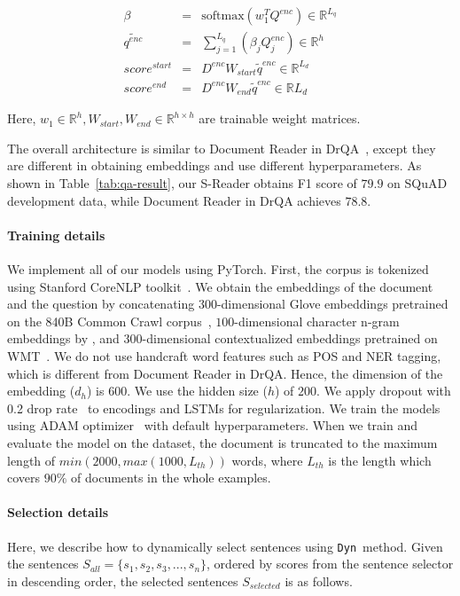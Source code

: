 \documentclass[11pt,a4paper]{article}
\newcommand{\dyn}{{\tt Dyn}}
\begin{document}
\vspace{-.5cm}
\begin{eqnarray}
	\beta &=& \mathrm{softmax} (w_1^T Q^{enc}) \in \mathbb{R}^{L_q} \\
	 {\tilde {q^{enc}}} &=& \sum_{j=1}^{L_q} (\beta_{j}Q^{enc}_j) \in \mathbb{R}^{h} \\
    score^{start} &=& D^{enc} W_{start} {\tilde q^{enc}} \in \mathbb{R}^{L_d} \\
    score^{end} &=& D^{enc} W_{end} {\tilde q^{enc}} \in \mathbb{R}{L_d}
\end{eqnarray}


Here, $w_{1} \in \mathbb{R}^{h}, W_{start}, W_{end} \in \mathbb{R}^{h \times h}$ are trainable weight matrices.

The overall architecture is similar to Document Reader in DrQA~\cite{squad-open}, except they are different in obtaining embeddings and use different hyperparameters.
As shown in Table~\ref{tab:qa-result}, our S-Reader obtains F1 score of $79.9$ on SQuAD development data, while Document Reader in DrQA achieves $78.8$.

\paragraph{Training details}
We implement all of our models using PyTorch. First, the corpus is tokenized using Stanford CoreNLP toolkit~\citep{corenlp}. We obtain the embeddings of the document and the question by concatenating $300$-dimensional Glove embeddings pretrained on the 840B Common Crawl corpus~\citep{glove}, $100$-dimensional character n-gram embeddings by \citet{charembedding}, and $300$-dimensional contextualized embeddings pretrained on WMT~\citep{cove}.
We do not use handcraft word features such as POS and NER tagging, which is different from Document Reader in DrQA.
Hence, the dimension of the embedding ($d_h$) is 600. We use the hidden size ($h$) of $200$.
We apply dropout with 0.2 drop rate~\cite{srivastava2014dropout} to encodings and LSTMs for regularization.
We train the models using ADAM optimizer~\citep{adam} with default hyperparameters.
When we train and evaluate the model on the dataset, the document is truncated to the maximum length of $min(2000, max(1000, L_{th}))$ words, where  $L_{th}$  is the length which covers $90\%$ of documents in the whole examples.

\paragraph{Selection details}
Here, we describe how to dynamically select sentences using \dyn~method. Given the sentences $S_{all} = \{s_1, s_2, s_3, ..., s_n\}$, ordered by scores from the sentence selector in descending order, the selected sentences $S_{selected}$ is as follows.
\end{document}
